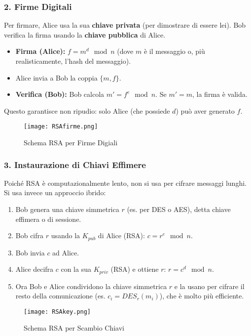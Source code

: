 \documentclass[../main.tex]{subfiles}
\begin{document}
\subsubsection{2. Firme Digitali}
Per firmare, Alice usa la sua \textbf{chiave privata} (per dimostrare di essere lei). Bob verifica la firma usando la \textbf{chiave pubblica} di Alice.
\begin{itemize}
    \item \textbf{Firma (Alice):} $f = m^d \mod n$ (dove $m$ è il messaggio o, più realisticamente, l'hash del messaggio).
    \item Alice invia a Bob la coppia $\{m, f\}$.
    \item \textbf{Verifica (Bob):} Bob calcola $m' = f^e \mod n$. Se $m' = m$, la firma è valida.
\end{itemize}
Questo garantisce non ripudio: solo Alice (che possiede $d$) può aver generato $f$.

\begin{figure}[H]
  \centering
  \texttt{[image: RSAfirme.png]}
  \caption{Schema RSA per Firme Digiali}
  \label{fig:}
\end{figure}
\subsubsection{3. Instaurazione di Chiavi Effimere}
Poiché RSA è computazionalmente lento, non si usa per cifrare messaggi lunghi. Si usa invece un approccio ibrido:
\begin{enumerate}
    \item Bob genera una chiave simmetrica $r$ (es. per DES o AES), detta chiave effimera o di sessione.
    \item Bob cifra $r$ usando la $K_{pub}$ di Alice (RSA): $c = r^e \mod n$.
    \item Bob invia $c$ ad Alice.
    \item Alice decifra $c$ con la sua $K_{priv}$ (RSA) e ottiene $r$: $r = c^d \mod n$.
    \item Ora Bob e Alice condividono la chiave simmetrica $r$ e la usano per cifrare il resto della comunicazione (es. $c_i = DES_r(m_i)$), che è molto più efficiente.
\end{enumerate}

\begin{figure}[H]
  \centering
  \texttt{[image: RSAkey.png]}
  \caption{Schema RSA per Scambio Chiavi}
  \label{fig:}
\end{figure}
\end{document}
